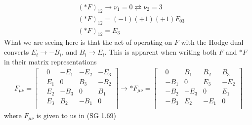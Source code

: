 %
\begin{align}
	&(\ast F)_{1 2} \rightarrow \nu_1 = 0 \rightleftarrows \nu_2 = 3 \\
	&(\ast F)_{1 2} = (-1) (+1) (+1) F_{03} \\
	&(\ast F)_{1 2} = E_3
\end{align}
%
What we are seeing here is that the act of operating on $F$ with the Hodge dual converts $E_i \rightarrow -B_i$, and $B_i \rightarrow E_i$. This is apparent when writing both $F$ and $\ast F$ in their matrix representations
%
\begin{align}
	F_{\mu\nu} = \begin{bmatrix}
		&0   &-E_1 &-E_2 &-E_3 \\ 
		&E_1 &0    &B_3  &-B_2 \\
		&E_2 &-B_3 &0    &B_1  \\
		&E_3 &B_2  &-B_1 &0    \\
	\end{bmatrix} 
	\rightarrow
	\ast F_{\mu\nu} = \begin{bmatrix}
	&0   &B_1 &B_2 &B_3 \\ 
	&-B_1 &0    &E_3  &-E_2 \\
	&-B_2 &-E_3 &0    &E_1  \\
	&-B_3 &E_2  &-E_1 &0    \\
	\end{bmatrix}
\end{align}	
%
where $F_{\mu\nu}$ is given to us in (SG 1.69)

